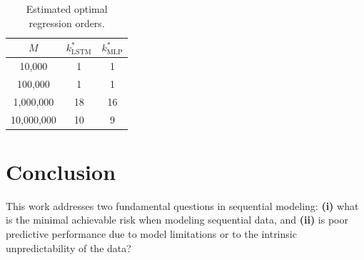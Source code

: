 \documentclass{article}
\begin{document}
\begin{table}[ht]
    \centering
    \begin{tabular}{c c c}
        \toprule
        \( M \) & \( k^*_{\text{LSTM}} \) & \( k^*_{\text{MLP}} \) \\
        \midrule
        10{,}000     & 1 & 1 \\
        100{,}000    & 1 & 1 \\
        1{,}000{,}000  & 18 & 16 \\
        10{,}000{,}000 & 10 & 9 \\
        \bottomrule
    \end{tabular}
    \caption{Estimated optimal regression orders.}
    \label{tab:optimal_regression_orders}
\end{table}

\section{Conclusion}


\label{sec:conclusion}

This work addresses two fundamental questions in sequential modeling: 
\textbf{(i)} what is the minimal achievable risk when modeling sequential data, and 
\textbf{(ii)} is poor predictive performance due to model limitations or to the intrinsic unpredictability of the data?
\end{document}
